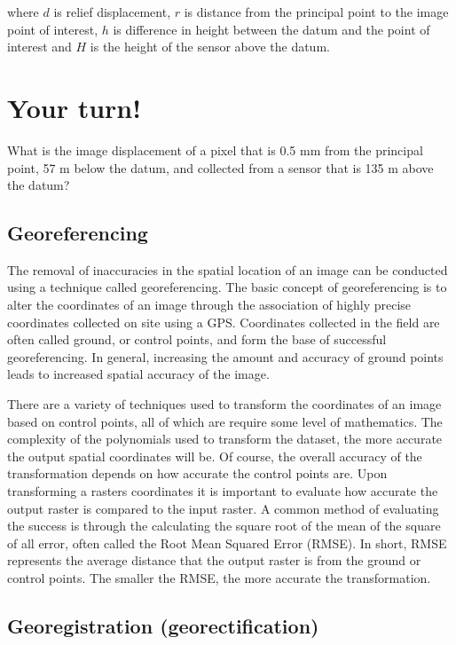 \documentclass[
]{book}
\begin{document}
where \(d\) is relief displacement, \(r\) is distance from the principal point to the image point of interest, \(h\) is difference in height between the datum and the point of interest and \(H\) is the height of the sensor above the datum.

\hypertarget{your-turn-6}{%
\section*{Your turn!}\label{your-turn-6}}

What is the image displacement of a pixel that is 0.5 mm from the principal point, 57 m below the datum, and collected from a sensor that is 135 m above the datum?

\hypertarget{georeferencing}{%
\subsection{Georeferencing}\label{georeferencing}}

The removal of inaccuracies in the spatial location of an image can be conducted using a technique called georeferencing. The basic concept of georeferencing is to alter the coordinates of an image through the association of highly precise coordinates collected on site using a GPS. Coordinates collected in the field are often called ground, or control points, and form the base of successful georeferencing. In general, increasing the amount and accuracy of ground points leads to increased spatial accuracy of the image.

There are a variety of techniques used to transform the coordinates of an image based on control points, all of which are require some level of mathematics. The complexity of the polynomials used to transform the dataset, the more accurate the output spatial coordinates will be. Of course, the overall accuracy of the transformation depends on how accurate the control points are. Upon transforming a rasters coordinates it is important to evaluate how accurate the output raster is compared to the input raster. A common method of evaluating the success is through the calculating the square root of the mean of the square of all error, often called the Root Mean Squared Error (RMSE). In short, RMSE represents the average distance that the output raster is from the ground or control points. The smaller the RMSE, the more accurate the transformation.

\hypertarget{georegistration-georectification}{%
\subsection{Georegistration (georectification)}\label{georegistration-georectification}}
\end{document}
